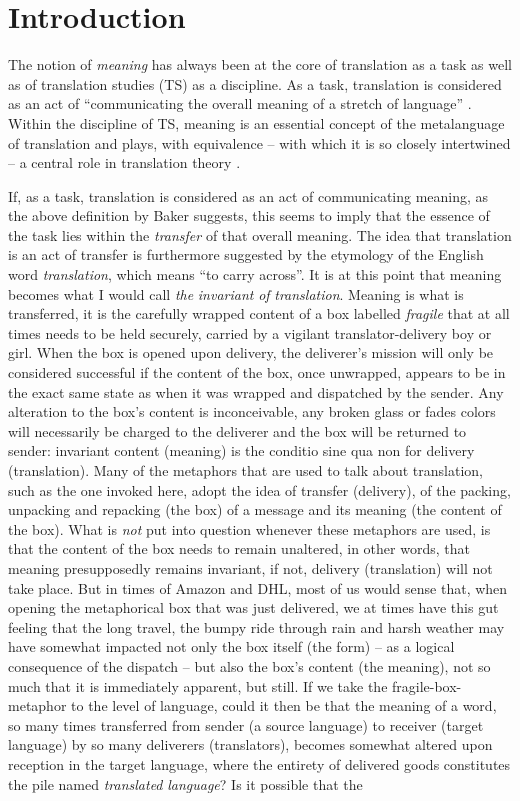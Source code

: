 \chapter{Introduction}

The notion of \textit{meaning} has always been at the core of translation as a task as well as of translation studies (TS) as a discipline. As a task, translation is considered as an act of “communicating the overall meaning of a stretch of language” \citep[10]{baker_other_1992}. Within the discipline of TS, meaning is an essential concept of the metalanguage of translation and plays, with equivalence – with which it is so closely intertwined – a central role in translation theory \citep{halverson_concept_1997}.

If, as a task, translation is considered as an act of communicating meaning, as the above definition by Baker suggests, this seems to imply that the essence of the task lies within the \textit{transfer} of that overall meaning. The idea that translation is an act of transfer is furthermore suggested by the etymology of the English word \textit{translation}, which means “to carry across”. It is at this point that meaning becomes what I would call \textit{the} \textit{invariant} \textit{of} \textit{translation}. Meaning is what is transferred, it is the carefully wrapped content of a box labelled \textit{fragile} that at all times needs to be held securely, carried by a vigilant translator-delivery boy or girl. When the box is opened upon delivery, the deliverer’s mission will only be considered successful if the content of the box, once unwrapped, appears to be in the exact same state as when it was wrapped and dispatched by the sender. Any alteration to the box’s content is inconceivable, any broken glass or fades colors will necessarily be charged to the deliverer and the box will be returned to sender: invariant content (meaning) is the conditio sine qua non for delivery (translation). Many of the metaphors that are used to talk about translation, such as the one invoked here, adopt the idea of transfer (delivery), of the packing, unpacking and repacking (the box) of a message and its meaning (the content of the box). What is \textit{not} put into question whenever these metaphors are used, is that the content of the box needs to remain unaltered, in other words, that meaning presupposedly remains invariant, if not, delivery (translation) will not take place. But in times of Amazon and DHL, most of us would sense that, when opening the metaphorical box that was just delivered, we at times have this gut feeling that the long travel, the bumpy ride through rain and harsh weather may have somewhat impacted not only the box itself (the form) – as a logical consequence of the dispatch – but also the box’s content (the meaning), not so much that it is immediately apparent, but still. If we take the fragile-box-metaphor to the level of language, could it then be that the meaning of a word, so many times transferred from sender (a source language) to receiver (target language) by so many deliverers (translators), becomes somewhat altered upon reception in the target language, where the entirety of delivered goods constitutes the pile named \textit{translated} \textit{language}? Is it possible that the 